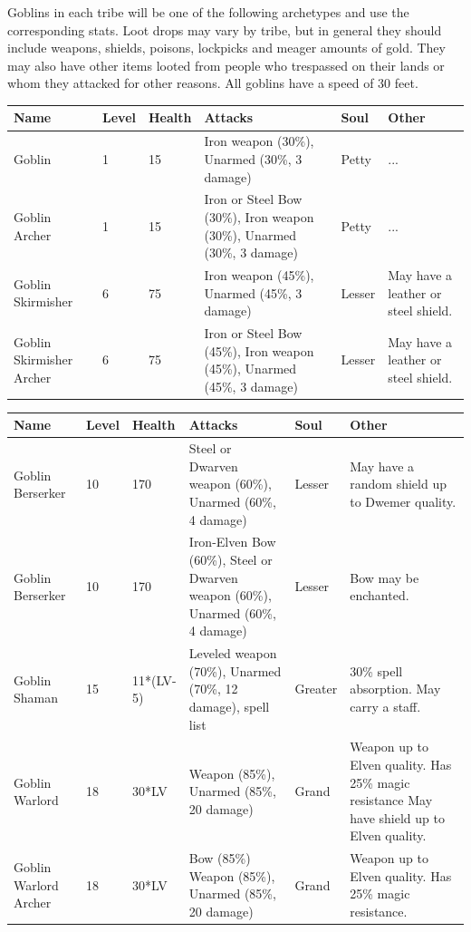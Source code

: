 \documentclass[12pt]{book}
\begin{document}
Goblins in each tribe will be one of the following archetypes and use the corresponding stats. Loot drops may vary by tribe, but in general they should include weapons, shields, poisons, lockpicks and meager amounts of gold. They may also have other items looted from people who trespassed on their lands or whom they attacked for other reasons. All goblins have a speed of 30 feet.

\begin{tabular}{p{}|p{}|p{}|p{}|p{}|p{}}
Name & Level & Health & Attacks & Soul & Other\\ \hline
Goblin & 1 & 15 & Iron weapon (30\%), Unarmed (30\%, 3 damage) & Petty & ...\\ \hline
Goblin Archer & 1 & 15 & Iron or Steel Bow (30\%), Iron weapon (30\%), Unarmed (30\%, 3 damage) & Petty & ...\\ \hline
Goblin Skirmisher & 6 & 75 & Iron weapon (45\%), Unarmed (45\%, 3 damage) & Lesser & May have a leather or steel shield.\\ \hline
Goblin Skirmisher Archer & 6 & 75 & Iron or Steel Bow (45\%), Iron weapon (45\%), Unarmed (45\%, 3 damage) & Lesser & May have a leather or steel shield.\\
\end{tabular}


\begin{tabular}{p{}|p{}|p{}|p{}|p{}|p{}}
Name & Level & Health & Attacks & Soul & Other\\ \hline
Goblin Berserker & 10 & 170 & Steel or Dwarven weapon (60\%), Unarmed (60\%, 4 damage) & Lesser & May have a random shield up to Dwemer quality.\\ \hline
Goblin Berserker & 10 & 170 & Iron-Elven Bow (60\%), Steel or Dwarven weapon (60\%), Unarmed (60\%, 4 damage) & Lesser & Bow may be enchanted.\\ \hline
Goblin Shaman & 15 & 11*(LV-5) & Leveled weapon (70\%), Unarmed (70\%, 12 damage), spell list & Greater & 30\% spell absorption. May carry a staff.\\ \hline
Goblin Warlord & 18 & 30*LV & Weapon (85\%), Unarmed (85\%, 20 damage) & Grand & Weapon up to Elven quality. Has 25\% magic resistance May have shield up to Elven quality.\\ \hline
Goblin Warlord Archer & 18 & 30*LV & Bow (85\%) Weapon (85\%), Unarmed (85\%, 20 damage) & Grand & Weapon up to Elven quality. Has 25\% magic resistance.\\
\end{tabular}
\end{document}
